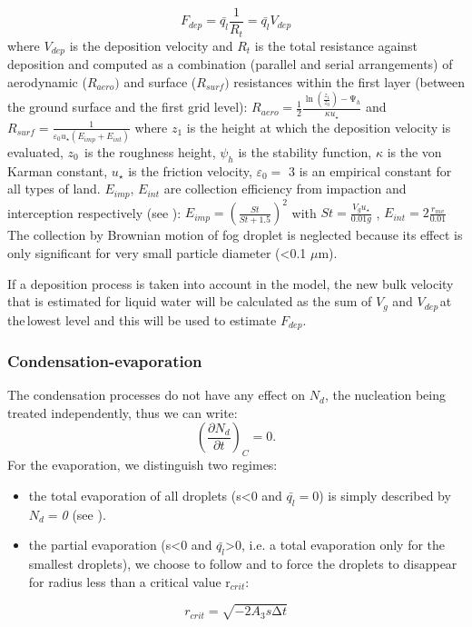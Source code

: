 \begin{equation}
F_{dep}=\bar{q_{l}}\frac{1}{R_{t}}=\bar{q_{l}}V_{dep}
\end{equation}
where $V_{dep}$ is the deposition velocity and $R_{t}$ is the total resistance
against deposition and computed as a combination (parallel and serial
arrangements) of aerodynamic ($R_{aero})$ and surface ($R_{surf})$ resistances
within the first layer (between the ground surface and the first grid level):
\newline
$R_{aero}=\frac{1}{2}\frac{\ln \left( \frac{z_{1}}{z_{0}}
\right)-\mathrm{\Psi }_{h}}{\kappa u_{\star }}$ and
$R_{surf}=\frac{1}{\varepsilon_{0}u_{\star }\left( E_{imp}+E_{int} \right)}$
\newline
where $z_{1}$ is the height at which the deposition velocity is evaluated,
$z_{0\, }$ is the roughness height, $\psi_{h}$ is the stability function,
$\kappa $ is the von Karman constant, $u_{\star }$ is the friction velocity,
$\varepsilon_{0}=$ 3 is an empirical constant for all types of land.
$E_{imp}$, $E_{int}$ are collection efficiency from impaction and interception
respectively (see \cite{Zhang:2001} ):
\newline
\newline
$E_{imp}=\left( \frac{St}{St+1.5} \right)^{2}$ with $St=\frac{V_{g}u_{\star
}}{0.01g}$ , $E_{int}=2\frac{r_{mv}}{0.01}$
\newline
\newline
The collection by Brownian motion of fog droplet is neglected because its
effect is only significant for very small particle diameter (\textless 0.1
$\mu$m).

If a deposition process is taken into account in the model, the new bulk
velocity that is estimated for liquid water will be calculated as the sum of
$V_{g}$ and $V_{dep\, }$at the$_{\, }$lowest level and this will be used to
estimate $F_{dep}$.

\subsubsection{Condensation-evaporation}
The condensation processes do not have any effect on $N_{d}$, the nucleation
being treated independently, thus we can write:
\begin{equation}
\left( \frac{\partial N_{d}}{\partial t} \right)_{C}=0.
\end{equation}
For the evaporation, we distinguish two regimes:
\begin{itemize}
\item the total evaporation of all droplets (s\textless 0 and
 $\bar{q_{l}}=$0) is simply described by $N_{d}=$\textit{0} (see \cite{Cohard:2000}).
\item the partial evaporation (s\textless 0 and
 $\bar{q_{l}}$\textgreater 0, i.e. a total evaporation only for the
 smallest droplets), we choose to follow \cite{Chaumerliac:1987} and to force
 the droplets to disappear for radius less than a critical value r$_{crit}$:
\end{itemize}
\begin{equation}
r_{crit}=\sqrt {-2A_{3}s\mathrm{\Delta }t}
\end{equation}


